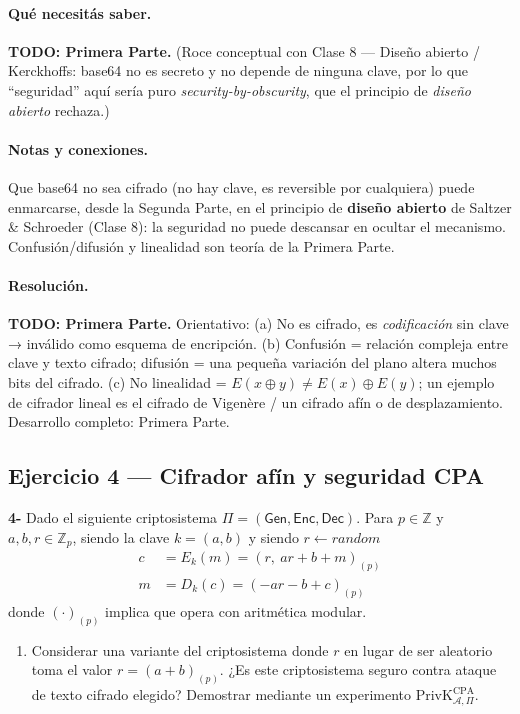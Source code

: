 \paragraph{Qué necesitás saber.}
\textbf{TODO: Primera Parte.} (Roce conceptual con Clase 8 — Diseño abierto / Kerckhoffs: base64
no es secreto y no depende de ninguna clave, por lo que ``seguridad'' aquí sería puro
\emph{security-by-obscurity}, que el principio de \emph{diseño abierto} rechaza.)

\paragraph{Notas y conexiones.}
Que base64 no sea cifrado (no hay clave, es reversible por cualquiera) puede enmarcarse, desde la
Segunda Parte, en el principio de \textbf{diseño abierto} de Saltzer \& Schroeder (Clase 8): la
seguridad no puede descansar en ocultar el mecanismo. Confusión/difusión y linealidad son teoría
de la Primera Parte.

\paragraph{Resolución.}
\textbf{TODO: Primera Parte.} Orientativo: (a) No es cifrado, es \emph{codificación} sin clave →
inválido como esquema de encripción. (b) Confusión = relación compleja entre clave y texto cifrado;
difusión = una pequeña variación del plano altera muchos bits del cifrado. (c) No linealidad =
$E(x\oplus y)\neq E(x)\oplus E(y)$; un ejemplo de cifrador lineal es el cifrado de Vigenère / un
cifrado afín o de desplazamiento. Desarrollo completo: Primera Parte.

\subsection{Ejercicio 4 — Cifrador afín y seguridad CPA}

\begin{consigna}
\textbf{4-} Dado el siguiente criptosistema $\Pi = (\mathsf{Gen}, \mathsf{Enc}, \mathsf{Dec})$.
Para $p \in \mathbb{Z}$ y $a,b,r \in \mathbb{Z}_p$, siendo la clave $k=(a,b)$ y siendo
$r \leftarrow \mathit{random}$
\begin{align*}
c &= E_k(m) = (r,\ ar + b + m)_{(p)} \\
m &= D_k(c) = (-ar - b + c)_{(p)}
\end{align*}
donde $(\cdot)_{(p)}$ implica que opera con aritmética modular.
\begin{enumerate}
\item[a)] Considerar una variante del criptosistema donde $r$ en lugar de ser aleatorio toma el valor $r = (a+b)_{(p)}$. ¿Es este criptosistema seguro contra ataque de texto cifrado elegido? Demostrar mediante un experimento $\mathrm{PrivK}^{\mathrm{CPA}}_{\mathcal{A},\Pi}$.
\end{enumerate}
\end{consigna}

